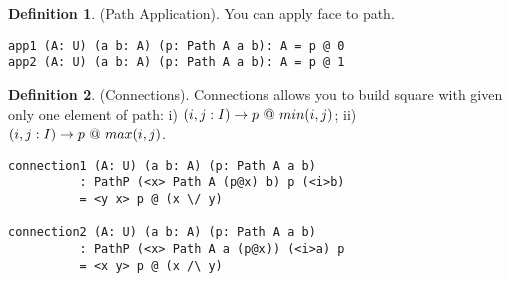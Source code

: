 \documentclass{article}
\theoremstyle{definition}
\newtheorem{definition}{Definition}
\begin{document}
\begin{definition} (Path Application).
You can apply face to path.
\begin{lstlisting}
app1 (A: U) (a b: A) (p: Path A a b): A = p @ 0
app2 (A: U) (a b: A) (p: Path A a b): A = p @ 1
\end{lstlisting}
\end{definition}

\begin{definition} (Connections).
Connections allows you to build square
with given only one element of path: i) $\\(i,j:I) \rightarrow p\ @\ min(i,j)$;
ii) $\\(i,j:I)\rightarrow p\ @\ max(i,j)$.
\begin{center}
\end{center}
\begin{lstlisting}
connection1 (A: U) (a b: A) (p: Path A a b)
          : PathP (<x> Path A (p@x) b) p (<i>b)
          = <y x> p @ (x \/ y)

connection2 (A: U) (a b: A) (p: Path A a b)
          : PathP (<x> Path A a (p@x)) (<i>a) p
          = <x y> p @ (x /\ y)
\end{lstlisting}
\end{definition}
\end{document}
